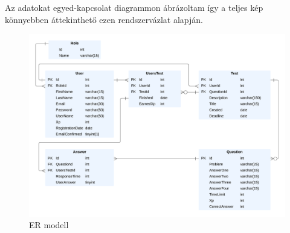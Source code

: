 \label{Adatmodell}

Az adatokat egyed-kapcsolat diagrammon ábrázoltam így a teljes kép könnyebben áttekinthető ezen rendszervázlat alapján.

\begin{figure}[H]
    \centering
    \includegraphics[width=\linewidth]{images/TestME_ER.png}
    \caption{ER modell}
    \label{fig:TestME_ER}
\end{figure}

